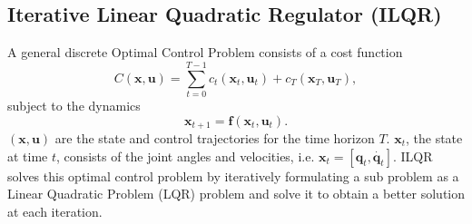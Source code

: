 \subsection{Iterative Linear Quadratic Regulator (ILQR)}
\label{sec:ilqr}

A general discrete Optimal Control Problem consists of a cost function
\begin{equation}
C(\bm{x}, \bm{u}) = \sum_{t=0}^{T-1} c_t(\bm{x}_t, \bm{u}_t) + c_T(\bm{x}_T, \bm{u}_T),
\label{eq:general_cost}
\end{equation}
subject to the dynamics
\begin{equation}
\bm{x}_{t+1} = \bm{f}(\bm{x}_t, \bm{u}_t).
\label{eq:general_dynamics}
\end{equation}
$(\bm{x}, \bm{u})$ are the state and control trajectories for the time horizon $T$. $\bm{x}_t$, the state at time $t$, consists of the joint angles and velocities, i.e. $\bm{x}_t = [\bm{q}_t, \dot{\bm{q}_t}]$.  ILQR solves this optimal control problem by iteratively formulating a sub problem as a Linear Quadratic Problem (LQR) problem and solve it to obtain a better solution at each iteration.

